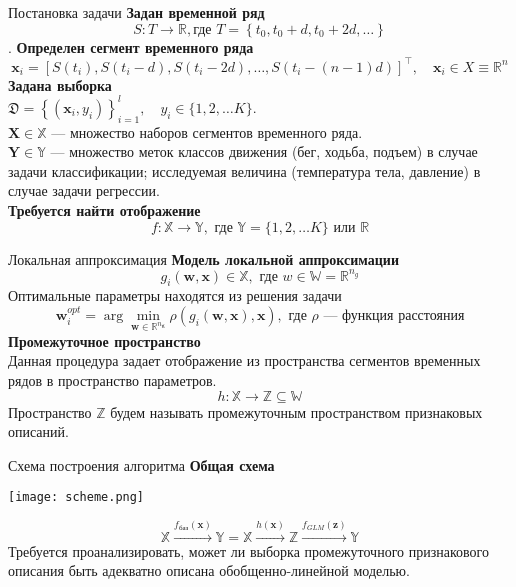 \documentclass[10pt,pdf,hyperref={unicode}]{beamer}
\begin{document}
\begin{frame}{Постановка задачи}
\justifying
\textbf{Задан временной ряд}
	$$S: T \rightarrow \mathbb{R}, \text{где } T = \left\lbrace t_0, t_0+d, t_0+2d, \ldots\right\rbrace $$.
\textbf{Определен сегмент временного ряда}
	$$\mathbf{x}_{i}=\left[S\left(t_{i}\right), S\left(t_{i}-d\right), S\left(t_{i}-2 d\right), \ldots, S\left(t_{i}-(n-1) d\right)\right]^{\top}, \quad \mathbf{x}_{i} \in X \equiv \mathbb{R}^{n}$$
\textbf{Задана выборка}\\
$\mathfrak{D}=\left\{\left(\mathbf{x}_{i}, y_{i}\right)\right\}_{i=1}^{l}, \quad y_{i} \in\{1,2, \ldots K\}.$\\
$\mathbf{X} \in \mathbb{X}$ --- множество наборов сегментов временного ряда.\\
$\mathbf{Y} \in \mathbb{Y}$ --- множество меток классов движения (бег, ходьба, подъем) в случае задачи классификации;  исследуемая величина (температура тела, давление) в случае задачи регрессии. \\
\textbf{Требуется найти отображение}
$$f:\mathbb{X} \rightarrow \mathbb{Y}, \text{ где } \mathbb{Y} = \{1,2, \ldots K\} \text{ или } \mathbb{R} $$
\end{frame}
\begin{frame}{Локальная аппроксимация}
\justifying
\textbf{Модель локальной аппроксимации}
$$g_i(\mathbf{w},\mathbf{x})\in \mathbb{X}, \text{ где } w \in \mathbb{W} = \mathbb{R}^{n_g}$$
Оптимальные параметры находятся из решения задачи 
$$\mathbf{w}^{opt}_i = \arg \min _{\mathbf{w} \in \mathbb{R}^{n_{\mathbf{g}}}} \rho(g_i(\mathbf{w}, \mathbf{x}), \mathbf{x}), \text{ где } \rho \text{ --- функция расстояния}$$
\textbf{Промежуточное пространство}\\
Данная процедура задает отображение из пространства сегментов временных рядов в пространство параметров.
$$ h:\mathbb{X} \rightarrow \mathbb{Z} \subseteq \mathbb{W} $$
Пространство $\mathbb{Z}$ будем называть промежуточным пространством признаковых описаний.




\end{frame}

\begin{frame}{Схема построения алгоритма}
\justifying
\textbf{Общая схема}\\
\begin{center}
	\texttt{[image: scheme.png]}
\end{center}
$$\mathbb{X}\xrightarrow{f_{\text{баз}}(\mathbf{x})}\mathbb{Y} =  \mathbb{X}\xrightarrow{h(\mathbf{x})}\mathbb{Z}\xrightarrow{f_{GLM}(\mathbf{z})}\mathbb{Y}$$
Требуется проанализировать, может ли выборка промежуточного признакового описания быть адекватно описана обобщенно-линейной моделью.


\end{frame}
\end{document}
